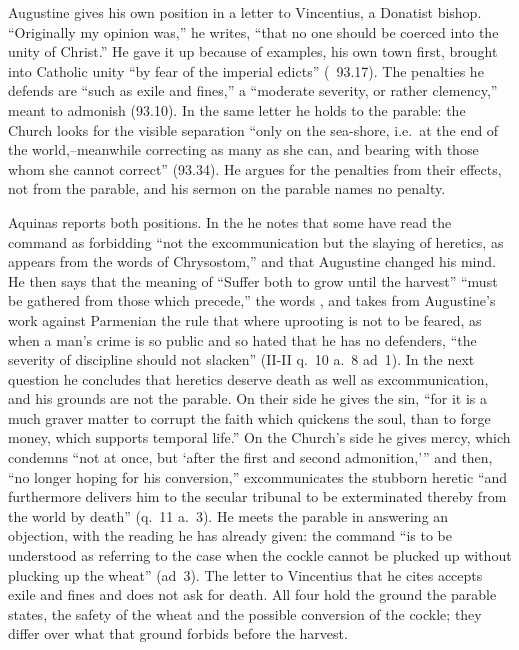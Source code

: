 Augustine gives his own position in a letter to Vincentius, a Donatist
bishop. ``Originally my opinion was,'' he writes, ``that no one should be
coerced into the unity of Christ.'' He gave it up because of examples, his own
town first, brought into Catholic unity ``by fear of the imperial edicts''
(~93.17). The penalties he defends are ``such as exile and fines,''
a ``moderate severity, or rather clemency,'' meant to admonish (93.10). In the
same letter he holds to the parable: the Church looks for the visible
separation ``only on the sea-shore, i.e.\ at the end of the world,--meanwhile
correcting as many as she can, and bearing with those whom she cannot
correct'' (93.34). He argues for the penalties from their effects, not from
the parable, and his sermon on the parable names no penalty.

Aquinas reports both positions. In the  he notes that some have
read the command as forbidding ``not the excommunication but the slaying of
heretics, as appears from the words of Chrysostom,'' and that Augustine
changed his mind. He then says that the meaning of ``Suffer both to grow until
the harvest'' ``must be gathered from those which precede,'' the words
, and takes from Augustine's work against Parmenian the rule
that where uprooting is not to be feared, as when a man's crime is so public
and so hated that he has no defenders, ``the severity of discipline should
not slacken'' (II-II q.~10 a.~8 ad~1). In the next question he concludes that
heretics deserve death as well as excommunication, and his grounds are not
the parable. On their side he gives the sin, ``for it is a much graver matter
to corrupt the faith which quickens the soul, than to forge money, which
supports temporal life.'' On the Church's side he gives mercy, which condemns
``not at once, but `after the first and second admonition,''' and then, ``no
longer hoping for his conversion,'' excommunicates the stubborn heretic ``and
furthermore delivers him to the secular tribunal to be exterminated thereby
from the world by death'' (q.~11 a.~3). He meets the parable in answering an
objection, with the reading he has already given: the command ``is to be
understood as referring to the case when the cockle cannot be plucked up
without plucking up the wheat'' (ad~3). The letter to Vincentius that he cites
accepts exile and fines and does not ask for death. All four hold the ground
the parable states, the safety of the wheat and the possible conversion of the
cockle; they differ over what that ground forbids before the harvest.

